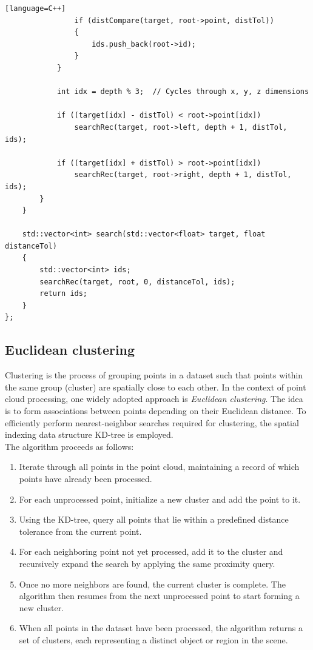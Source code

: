 \begin{lstlisting}[basicstyle=\ttfamily\scriptsize][language=C++]
                if (distCompare(target, root->point, distTol))
                {
                    ids.push_back(root->id);
                }
            }

            int idx = depth % 3;  // Cycles through x, y, z dimensions
            
            if ((target[idx] - distTol) < root->point[idx])
                searchRec(target, root->left, depth + 1, distTol, ids);

            if ((target[idx] + distTol) > root->point[idx])
                searchRec(target, root->right, depth + 1, distTol, ids);
        }
    }

    std::vector<int> search(std::vector<float> target, float distanceTol)
    {
        std::vector<int> ids;
        searchRec(target, root, 0, distanceTol, ids);
        return ids;
    }
};
\end{lstlisting}

\subsection{Euclidean clustering}

Clustering is the process of grouping points in a dataset such that points within the same group (cluster) are spatially close to each other. 
In the context of point cloud processing, one widely adopted approach is \textit{Euclidean clustering}. 
The idea is to form associations between points depending on their Euclidean distance. 
To efficiently perform nearest-neighbor searches required for clustering, the spatial indexing data structure KD-tree is employed.  
\\
The algorithm proceeds as follows:
\begin{enumerate}
    \item Iterate through all points in the point cloud, maintaining a record of which points have already been processed.
    \item For each unprocessed point, initialize a new cluster and add the point to it.
    \item Using the KD-tree, query all points that lie within a predefined distance tolerance from the current point.
    \item For each neighboring point not yet processed, add it to the cluster and recursively expand the search by applying the same proximity query.
    \item Once no more neighbors are found, the current cluster is complete. The algorithm then resumes from the next unprocessed point to start forming a new cluster.
    \item When all points in the dataset have been processed, the algorithm returns a set of clusters, each representing a distinct object or region in the scene.
\end{enumerate}

